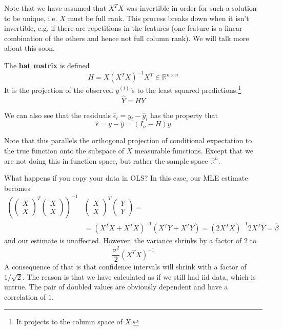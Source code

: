   Note that we have assumed that $X^T X$ was invertible in order for such a solution to be unique, i.e. $X$ must be full rank. This process breaks down when it isn't invertible, e.g. if there are repetitions in the features (one feature is a linear combination of the others and hence not full column rank). We will talk more about this soon. 

  \begin{definition}
    The \textbf{hat matrix} is defined 
    \begin{equation}
      H = X (X^T X)^{-1} X^T \in \mathbb{R}^{n \times n}
    \end{equation}
    It is the projection of the observed $y^{(i)}$'s to the least squared predictions.\footnote{It projects to the column space of $X$.} 
    \begin{equation}
      \hat{Y} = H Y
    \end{equation}
  \end{definition}

  We can also see that the residuals $\hat{\epsilon}_i = y_i - \hat{y}_i$ has the property that 
  \begin{equation}
    \hat{\epsilon} = y - \hat{y} = (I_n - H) y 
  \end{equation}

  Note that this parallels the orthogonal projection of conditional expectation to the true function onto the subspace of $X$ measurable functions. Except that we are not doing this in function space, but rather the sample space $\mathbb{R}^n$. 

  \begin{example}
    What happens if you copy your data in OLS? In this case, our MLE estimate becomes 
    \begin{align*}
        \left(\begin{pmatrix}X \\ X \end{pmatrix}^T \begin{pmatrix} X \\ X \end{pmatrix} \right )^{-1} & \begin{pmatrix} X \\ X  \end{pmatrix}^T \begin{pmatrix} Y \\ Y  \end{pmatrix}  =\\
    & = (X^T X + X^T X)^{-1} (X^T Y + X^T Y ) = (2 X^T X)^{-1} 2 X^T Y = \hat{\beta}
    \end{align*}
    and our estimate is unaffected. However, the variance shrinks by a factor of $2$ to 
    \begin{equation}
      \frac{\sigma^2}{2} (X^T X)^{-1}
    \end{equation}
    A consequence of that is that confidence intervals will shrink with a factor of $1/\sqrt{2}$. The reason is that we have calculated as if we still had iid data, which is untrue. The pair of doubled values are obviously dependent and have a correlation of $1$. 
  \end{example}

